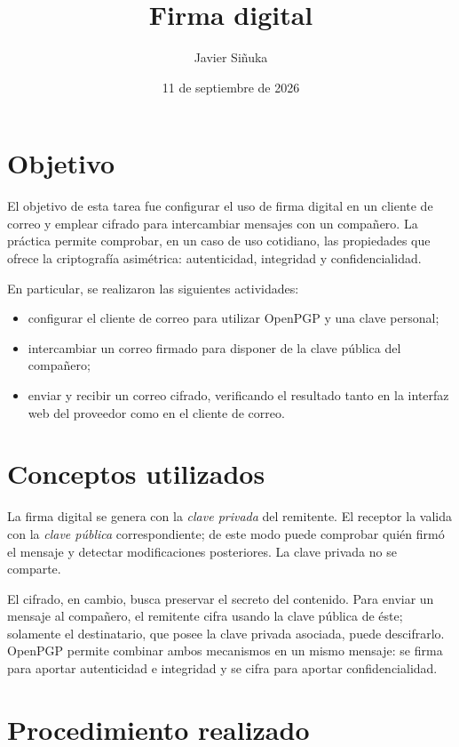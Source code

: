\documentclass[11pt,a4paper]{article}
\title{Firma digital}
\author{Javier Siñuka}
\date{11 de septiembre de 2026}
\begin{document}
\maketitle

\section{Objetivo}

El objetivo de esta tarea fue configurar el uso de firma digital en un cliente
de correo y emplear cifrado para intercambiar mensajes con un compañero. La
práctica permite comprobar, en un caso de uso cotidiano, las propiedades que
ofrece la criptografía asimétrica: autenticidad, integridad y confidencialidad.

En particular, se realizaron las siguientes actividades:

\begin{itemize}[noitemsep]
    \item configurar el cliente de correo para utilizar OpenPGP y una clave
    personal;
    \item intercambiar un correo firmado para disponer de la clave pública del
    compañero;
    \item enviar y recibir un correo cifrado, verificando el resultado tanto
    en la interfaz web del proveedor como en el cliente de correo.
\end{itemize}

\section{Conceptos utilizados}

La firma digital se genera con la \emph{clave privada} del remitente. El
receptor la valida con la \emph{clave pública} correspondiente; de este modo
puede comprobar quién firmó el mensaje y detectar modificaciones posteriores.
La clave privada no se comparte.

El cifrado, en cambio, busca preservar el secreto del contenido. Para enviar
un mensaje al compañero, el remitente cifra usando la clave pública de éste;
solamente el destinatario, que posee la clave privada asociada, puede
descifrarlo. OpenPGP permite combinar ambos mecanismos en un mismo mensaje:
se firma para aportar autenticidad e integridad y se cifra para aportar
confidencialidad.

\section{Procedimiento realizado}
\end{document}
